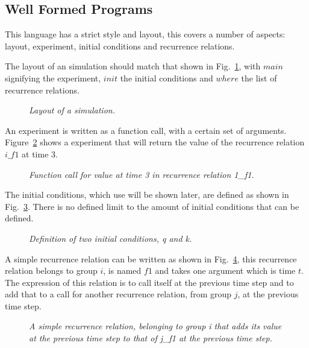 \documentclass{article}
\begin{document}
\subsection{Well Formed Programs} \label{wellformedprogs} 
This language has a strict style and layout, this covers a number of aspects: layout, experiment, initial conditions and recurrence relations.  

The layout of an simulation should match that shown in Fig.~\ref{fig:1exofla}, with $main$ signifying the experiment, $init$ the initial conditions and $where$ the list of recurrence relations. 
\begin{figure}[H]
	\centering
	
	\caption{\it Layout of a simulation.}
	\label{fig:1exofla}
\end{figure} 

An experiment is written as a function call, with a certain set of arguments. Figure~\ref{fig:2exofla} shows a experiment that will return the value of the recurrence relation $i\_f1$ at time $3$.
\begin{figure}[H]
	\centering
	
	\caption{\it Function call for value at time 3 in recurrence relation 1\_f1.}
	\label{fig:2exofla}
\end{figure} 
 
The initial conditions, which use will be shown later, are defined as shown in Fig.~\ref{fig:3exofla}. There is no defined  limit to the amount of initial conditions that can be defined. 
\begin{figure}[H]
	\centering
	
	\caption{\it Definition of two initial conditions, q and k.}
	\label{fig:3exofla}
\end{figure} 
 
A simple recurrence relation can be written as shown in Fig.~\ref{fig:4exofla}, this recurrence relation belongs to group $i$, is named $f1$ and takes one argument which is time $t$. The expression of this relation is to call itself at the previous time step and to add that to a call for another recurrence relation, from group $j$, at the previous time step. 
\begin{figure}[H]
	\centering
	
	\caption{\it A simple recurrence relation, belonging to group i that adds its value at the previous time step to that of j\_f1 at the previous time step.}
	\label{fig:4exofla}
\end{figure} 
 
\end{document}

